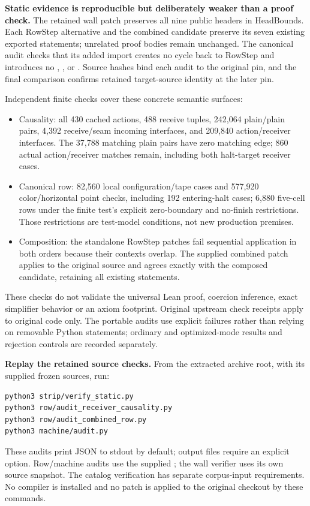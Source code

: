 \textbf{Static evidence is reproducible but deliberately weaker than a proof check.} The retained wall patch preserves all nine public headers in HeadBounds. Each RowStep alternative and the combined candidate preserve its seven existing exported statements; unrelated proof bodies remain unchanged. The canonical audit checks that its added import creates no cycle back to RowStep and introduces no , ,  or . Source hashes bind each audit to the original pin, and the final comparison confirms retained target-source identity at the later pin.

Independent finite checks cover these concrete semantic surfaces:
\begin{itemize}
\item Causality: all 430 cached actions, 488 receive tuples, 242,064 plain/plain pairs, 4,392 receive/seam incoming interfaces, and 209,840 action/receiver interfaces. The 37,788 matching plain pairs have zero matching edge; 860 actual action/receiver matches remain, including both halt-target receiver cases.
\item Canonical row: 82,560 local configuration/tape cases and 577,920 color/horizontal point checks, including 192 entering-halt cases; 6,880 five-cell rows under the finite test's explicit zero-boundary and no-finish restrictions. Those restrictions are test-model conditions, not new production premises.
\item Composition: the standalone RowStep patches fail sequential application in both orders because their contexts overlap. The supplied combined patch applies to the original source and agrees exactly with the composed candidate, retaining all existing statements.
\end{itemize}
These checks do not validate the universal Lean proof, coercion inference, exact simplifier behavior or an axiom footprint. Original upstream check receipts apply to original code only. The portable audits use explicit failures rather than relying on removable Python  statements; ordinary and optimized-mode results and rejection controls are recorded separately.

\textbf{Replay the retained source checks.} From the extracted archive root, with its supplied frozen sources, run:
\begin{lstlisting}
python3 strip/verify_static.py
python3 row/audit_receiver_causality.py
python3 row/audit_combined_row.py
python3 machine/audit.py
\end{lstlisting}
These audits print JSON to stdout by default; output files require an explicit option. Row/machine audits use the supplied ; the wall verifier uses its own source snapshot. The catalog verification has separate corpus-input requirements. No compiler is installed and no patch is applied to the original checkout by these commands.

